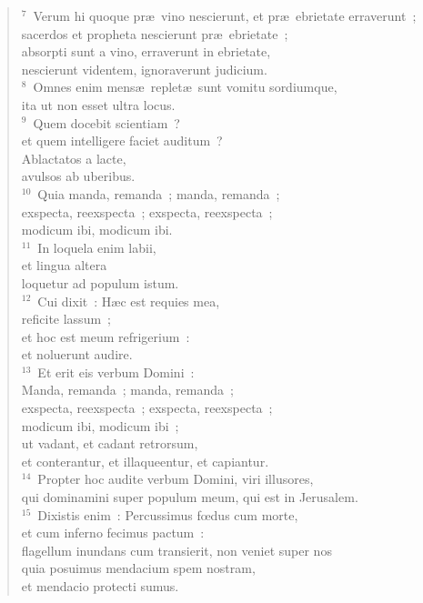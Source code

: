 \begin{flushleft}\begin{verse}${}^{7}$~Verum hi quoque pr\ae\ vino nescierunt, et pr\ae\ ebrietate erraverunt~;\\ sacerdos et propheta nescierunt pr\ae\ ebrietate~;\\ absorpti sunt a vino, erraverunt in ebrietate,\\ nescierunt videntem, ignoraverunt judicium.\\
${}^{8}$~Omnes enim mens\ae\ replet\ae\ sunt vomitu sordiumque,\\ ita ut non esset ultra locus.\\
${}^{9}$~Quem docebit scientiam~?\\ et quem intelligere faciet auditum~?\\ Ablactatos a lacte,\\ avulsos ab uberibus.\\
${}^{10}$~Quia manda, remanda~; manda, remanda~;\\ exspecta, reexspecta~; exspecta, reexspecta~;\\ modicum ibi, modicum ibi.\\
${}^{11}$~In loquela enim labii,\\ et lingua altera\\ loquetur ad populum istum.\\
${}^{12}$~Cui dixit~: H\ae c est requies mea,\\ reficite lassum~;\\ et hoc est meum refrigerium~:\\ et noluerunt audire.\\
${}^{13}$~Et erit eis verbum Domini~:\\ Manda, remanda~; manda, remanda~;\\ exspecta, reexspecta~; exspecta, reexspecta~;\\ modicum ibi, modicum ibi~;\\ ut vadant, et cadant retrorsum,\\ et conterantur, et illaqueentur, et capiantur.\\
${}^{14}$~Propter hoc audite verbum Domini, viri illusores,\\ qui dominamini super populum meum, qui est in Jerusalem.\\
${}^{15}$~Dixistis enim~: Percussimus fœdus cum morte,\\ et cum inferno fecimus pactum~:\\ flagellum inundans cum transierit, non veniet super nos\\ quia posuimus mendacium spem nostram,\\ et mendacio protecti sumus.\\

\end{verse}
\end{flushleft}

